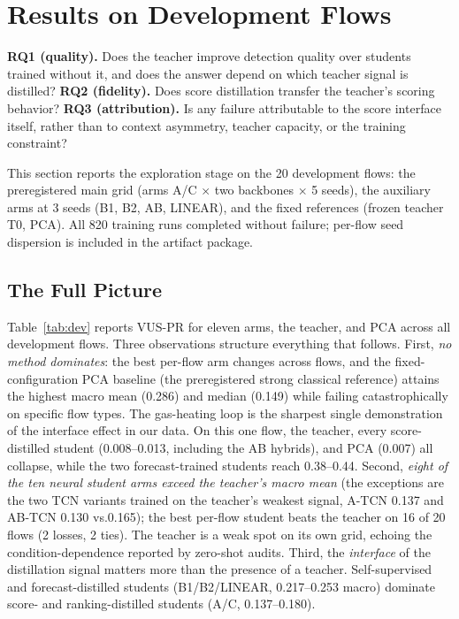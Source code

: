 \section{Results on Development Flows}\label{sec:dev-results}
\noindent
{\bfseries RQ1 (quality).} Does the teacher improve detection quality over students trained without it, and does the answer depend on which teacher signal is distilled? {\bfseries RQ2 (fidelity).} Does score distillation transfer the teacher's scoring behavior? {\bfseries RQ3 (attribution).} Is any failure attributable to the score interface itself, rather than to context asymmetry, teacher capacity, or the training constraint?

This section reports the exploration stage on the 20 development flows:
the preregistered main grid (arms A/C $\times$ two backbones $\times$ 5
seeds), the auxiliary arms at 3 seeds (B1, B2, AB, LINEAR), and the fixed
references (frozen teacher T0, PCA). All 820 training runs completed without
failure; per-flow seed dispersion is included in the artifact package.

\subsection{The Full Picture}\label{sec:dev-picture}
Table~\ref{tab:dev} reports VUS-PR for eleven arms, the teacher, and PCA
across all development flows. Three observations structure everything that
follows. First, \emph{no method dominates}: the best per-flow arm changes
across flows, and the fixed-configuration PCA baseline (the preregistered strong
classical reference) attains the highest macro mean (0.286) and median
(0.149) while failing catastrophically on specific flow types. The gas-heating loop
is the sharpest single demonstration of the interface effect in our
data. On this one flow, the teacher, every score-distilled student
(0.008--0.013, including the AB hybrids), and PCA (0.007) all collapse,
while the two
forecast-trained students reach 0.38--0.44. Second, \emph{eight of the ten neural student arms exceed the
teacher's macro mean} (the exceptions are the two TCN variants trained
on the teacher's weakest signal, A-TCN 0.137 and AB-TCN 0.130 vs.0.165); the best per-flow student beats the teacher on 16 of 20 flows
(2 losses, 2 ties). The teacher is a weak spot on its own grid, echoing the
condition-dependence reported by zero-shot audits. Third, the \emph{interface} of the distillation signal
matters more than the presence of a teacher. Self-supervised and
forecast-distilled students (B1/B2/LINEAR, 0.217--0.253 macro) dominate
score- and ranking-distilled students (A/C, 0.137--0.180).

